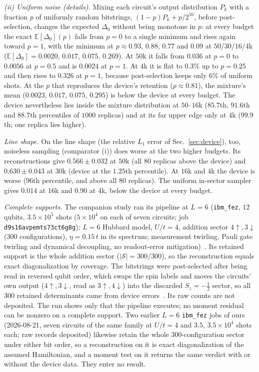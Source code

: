 \documentclass[submission, PhysCore]{SciPost}
\begin{document}
\begin{appendix}
\emph{(ii) Uniform noise (details).} Mixing each circuit's output distribution $P_k$ with a fraction $p$ of uniformly random bitstrings, $(1-p)P_k+p/2^{16}$, before post-selection, changes the expected $\Delta_0$ without being monotone in $p$: at every budget the exact $\mathbb{E}[\Delta_0](p)$ falls from $p=0$ to a single minimum and rises again toward $p=1$, with the minimum at $p\approx0.93$, $0.88$, $0.77$ and $0.09$ at $50$/$30$/$16$/$4$k ($\mathbb{E}[\Delta_0]=0.0020$, $0.017$, $0.075$, $0.269$). At $50$k it falls from $0.036$ at $p=0$ to $0.0056$ at $p=0.5$ and is $0.0024$ at $p=1$. At $4$k it is flat to $0.3\%$ up to $p=0.25$ and then rises to $0.326$ at $p=1$, because post-selection keeps only $6\%$ of uniform shots. At the $p$ that reproduces the device's retention ($p\approx0.81$), the mixture's mean ($0.0023$, $0.017$, $0.075$, $0.295$) is below the device at every budget. The device nevertheless lies inside the mixture distribution at $50$--$16$k ($85.7$th, $91.6$th and $88.7$th percentiles of $1000$ replicas) and at its far upper edge only at $4$k ($99.9$th; one replica lies higher).

\emph{Line shape.} On the line shape (the relative $L_1$ error of Sec.~\ref{sec:device}), too, noiseless sampling (comparator (i)) does worse at the two higher budgets. Its reconstructions give $0.566\pm0.032$ at $50$k (all $80$ replicas above the device) and $0.630\pm0.043$ at $30$k (device at the $1.25$th percentile). At $16$k and $4$k the device is worse ($96$th percentile, and above all $80$ replicas). The uniform in-sector sampler gives $0.014$ at $16$k and $0.90$ at $4$k, below the device at every budget.

\emph{Complete supports.} The companion study ran its pipeline at $L=6$ (\texttt{ibm\_fez}, $12$ qubits, $3.5\times10^{5}$ shots ($5\times10^{4}$ on each of seven circuits; job \texttt{d9s16avpemts73ct6g8g}); $L=6$ Hubbard model, $U/t=4$, addition sector $4\!\uparrow,3\!\downarrow$ ($300$ configurations), $\eta=0.15\,t$ in its spectrum; measurement twirling, Pauli gate twirling and dynamical decoupling, no readout-error mitigation)~\cite{SQDspec2608}. Its retained support is the whole addition sector (${|\mathcal S|=300/300}$), so the reconstruction equals exact diagonalization by coverage. The bitstrings were post-selected after being read in reversed qubit order, which swaps the spin labels and moves the circuits' own output ($4\!\uparrow,3\!\downarrow$, read as $3\!\uparrow,4\!\downarrow$) into the discarded $S_z=-\tfrac12$ sector, so all $300$ retained determinants came from device errors~\cite{SQDspec2608}. Its raw counts are not deposited. The run shows only that the pipeline executes; no moment residual can be nonzero on a complete support. Two earlier $L=6$ \texttt{ibm\_fez} jobs of ours (2026-08-21, seven circuits of the same family at $U/t=4$ and $3.5$, $3.5\times10^{4}$ shots each; raw records deposited) likewise retain the whole $300$-configuration sector under either bit order, so a reconstruction on it is exact diagonalization of the assumed Hamiltonian, and a moment test on it returns the same verdict with or without the device data. They enter no result.


\end{appendix}
\end{document}
